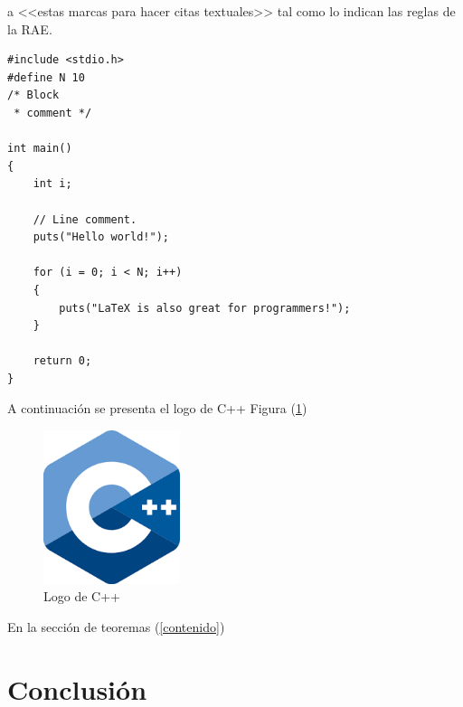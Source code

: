 \documentclass{article}
\begin{document}
a <<estas marcas para hacer citas textuales>> tal como 
lo indican las reglas de la RAE. \cite{dirac}

\begin{lstlisting}
#include <stdio.h>
#define N 10
/* Block
 * comment */

int main()
{
    int i;

    // Line comment.
    puts("Hello world!");
    
    for (i = 0; i < N; i++)
    {
        puts("LaTeX is also great for programmers!");
    }

    return 0;
}
\end{lstlisting}

A continuación se presenta el logo de C++ Figura (\ref{fig:cpplogo})

\begin{figure}[h]
\includegraphics[width=4cm]{cpplogo.png}
\centering
\caption{Logo de C++}
\label{fig:cpplogo}
\end{figure}

En la sección de teoremas (\ref{contenido})

\section{Conclusión} \label{conclulsion}



\end{document}
